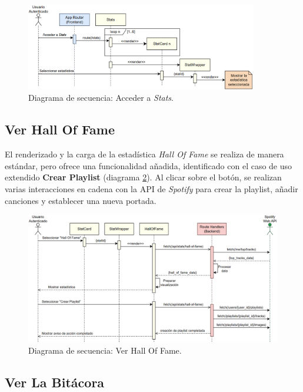 \begin{figure}[H]
    \centering
    \includegraphics[width=0.9\textwidth]{figures/diagramas_secuencia/ds_acceder_stats.png}
    \caption{Diagrama de secuencia: Acceder a \textit{Stats}.}
    \label{fig:ds_acceder_stats}
\end{figure}

\subsection*{Ver Hall Of Fame}

El renderizado y la carga de la estadística \textit{Hall Of Fame} se realiza de manera estándar, pero ofrece una funcionalidad añadida, identificado con el caso de uso extendido \textbf{Crear Playlist} (diagrama \ref{fig:ds_ver_hall_of_fame}). Al clicar sobre el botón, se realizan varias interacciones en cadena con la API de \textit{Spotify} para crear la playlist, añadir canciones y establecer una nueva portada.

\begin{figure}[H]
    \centering
    \includegraphics[width=\textwidth]{figures/diagramas_secuencia/ds_ver_hall_of_fame.png}
    \caption{Diagrama de secuencia: Ver Hall Of Fame.}
    \label{fig:ds_ver_hall_of_fame}
\end{figure}

\subsection*{Ver La Bitácora}

